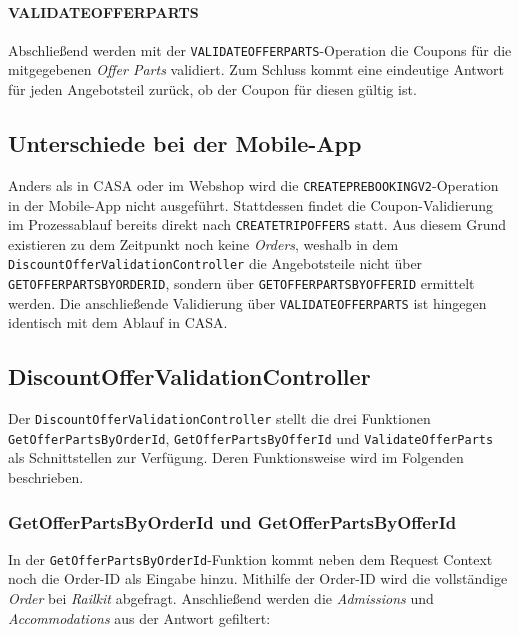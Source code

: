 \paragraph{VALIDATEOFFERPARTS}

Abschließend werden mit der \texttt{VALIDATEOFFERPARTS}-Operation die Coupons für die mitgegebenen \textit{Offer Parts} validiert. Zum Schluss kommt eine eindeutige Antwort für jeden Angebotsteil zurück, ob der Coupon für diesen gültig ist.


\subsection{Unterschiede bei der Mobile-App}
\label{subsec:prozess_mobile}

Anders als in CASA oder im Webshop wird die \texttt{CREATEPREBOOKINGV2}-Operation in der Mobile-App nicht ausgeführt. Stattdessen findet die Coupon-Validierung im Prozessablauf bereits direkt nach \texttt{CREATETRIPOFFERS} statt. Aus diesem Grund existieren zu dem Zeitpunkt noch keine \textit{Orders}, weshalb in dem \texttt{DiscountOfferValidationController} die Angebotsteile nicht über \texttt{GETOFFERPARTSBYORDERID}, sondern über \texttt{GETOFFERPARTSBYOFFERID} ermittelt werden. Die anschließende Validierung über \texttt{VALIDATEOFFERPARTS} ist hingegen identisch mit dem Ablauf in CASA.


\subsection{DiscountOfferValidationController}
\label{subsec:controller}

Der \texttt{DiscountOfferValidationController} stellt die drei Funktionen \texttt{GetOfferPartsByOrderId}, \texttt{GetOfferPartsByOfferId} und \texttt{ValidateOfferParts} als Schnittstellen zur Verfügung. Deren Funktionsweise wird im Folgenden beschrieben.

\subsubsection{GetOfferPartsByOrderId und GetOfferPartsByOfferId}
\label{subsubsec:getofferparts}

In der \texttt{GetOfferPartsByOrderId}-Funktion kommt neben dem Request Context noch die Order-ID als Eingabe hinzu. Mithilfe der Order-ID wird die vollständige \textit{Order} bei \textit{Railkit} abgefragt. Anschließend werden die \textit{Admissions} und \textit{Accommodations} aus der Antwort gefiltert:

